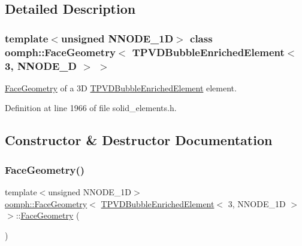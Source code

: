 \subsection{Detailed Description}
\subsubsection*{template$<$unsigned N\+N\+O\+D\+E\+\_\+1D$>$\newline
class oomph\+::\+Face\+Geometry$<$ T\+P\+V\+D\+Bubble\+Enriched\+Element$<$ 3, N\+N\+O\+D\+E\+\_\+D $>$ $>$}

\hyperlink{classoomph_1_1FaceGeometry}{Face\+Geometry} of a 3D \hyperlink{classoomph_1_1TPVDBubbleEnrichedElement}{T\+P\+V\+D\+Bubble\+Enriched\+Element} element. 

Definition at line 1966 of file solid\+\_\+elements.\+h.



\subsection{Constructor \& Destructor Documentation}
\mbox{\label{classoomph_1_1FaceGeometry_3_01TPVDBubbleEnrichedElement_3_013_00_01NNODE__1D_01_4_01_4_acbeb095ed3639f72d0c5fee3d4971ba1}} 
\subsubsection{\texorpdfstring{Face\+Geometry()}{FaceGeometry()}}
{\footnotesize\ttfamily template$<$unsigned N\+N\+O\+D\+E\+\_\+1D$>$ \\
\hyperlink{classoomph_1_1FaceGeometry}{oomph\+::\+Face\+Geometry}$<$ \hyperlink{classoomph_1_1TPVDBubbleEnrichedElement}{T\+P\+V\+D\+Bubble\+Enriched\+Element}$<$ 3, N\+N\+O\+D\+E\+\_\+1D $>$ $>$\+::\hyperlink{classoomph_1_1FaceGeometry}{Face\+Geometry} (\begin{DoxyParamCaption}{ }\end{DoxyParamCaption})\hspace{0.3cm}{\ttfamily [inline]}}



